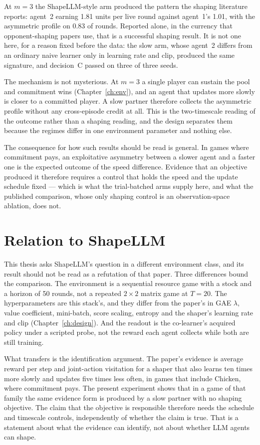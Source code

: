 At \(m=3\) the ShapeLLM-style arm produced the pattern the shaping
literature reports: agent~2 earning 1.81 units per live round against
agent~1's 1.01, with the asymmetric profile on 0.83 of rounds.
Reported alone, in the currency that opponent-shaping papers use, that is a
successful shaping result.
It is not one here, for a reason fixed before the data: the slow arm, whose
agent~2 differs from an ordinary naive learner only in learning rate and
clip, produced the same signature, and decision~C passed on three of three
seeds.

The mechanism is not mysterious.
At \(m=3\) a single player can sustain the pool and commitment wins
(Chapter~\ref{ch:env}), and an agent that updates more slowly is closer to a
committed player.
A slow partner therefore collects the asymmetric profile without any
cross-episode credit at all.
This is the two-timescale reading of the outcome rather than a shaping
reading, and the design separates them because the regimes differ in one
environment parameter and nothing else.

The consequence for how such results should be read is general.
In games where commitment pays, an exploitative asymmetry between a slower
agent and a faster one is the expected outcome of the speed difference.
Evidence that an objective produced it therefore requires a control that
holds the speed and the update schedule fixed --- which is what the
trial-batched arms supply here, and what the published comparison, whose
only shaping control is an observation-space ablation, does not.

\section{Relation to ShapeLLM}
\label{sec:disc-shapellm}

This thesis asks ShapeLLM's question in a different environment class, and
its result should not be read as a refutation of that paper.
Three differences bound the comparison.
The environment is a sequential resource game with a stock and a horizon of
50 rounds, not a repeated \(2\times2\) matrix game at \(T=20\).
The hyperparameters are this stack's, and they differ from the paper's in
GAE \(\lambda\), value coefficient, mini-batch, score scaling, entropy and
the shaper's learning rate and clip (Chapter~\ref{ch:design}).
And the readout is the co-learner's acquired policy under a scripted probe,
not the reward each agent collects while both are still training.

What transfers is the identification argument.
The paper's evidence is average reward per step and joint-action visitation
for a shaper that also learns ten times more slowly and updates five times
less often, in games that include Chicken, where commitment pays.
The present experiment shows that in a game of that family the same evidence
form is produced by a slow partner with no shaping objective.
The claim that the objective is responsible therefore needs the schedule and
timescale controls, independently of whether the claim is true.
That is a statement about what the evidence can identify, not about whether
LLM agents can shape.

